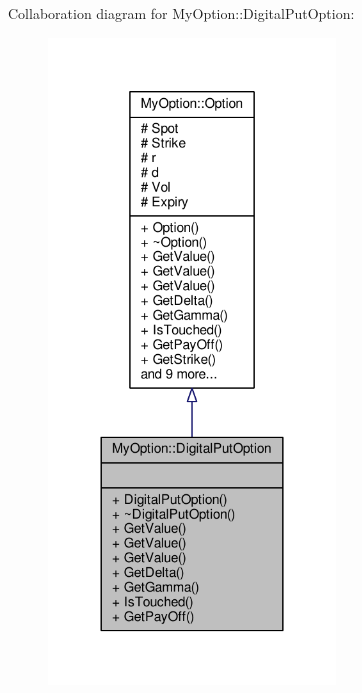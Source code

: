 Collaboration diagram for My\+Option\+:\+:Digital\+Put\+Option\+:
\nopagebreak
\begin{figure}[H]
\begin{center}
\leavevmode
\includegraphics[width=216pt]{classMyOption_1_1DigitalPutOption__coll__graph}
\end{center}
\end{figure}
